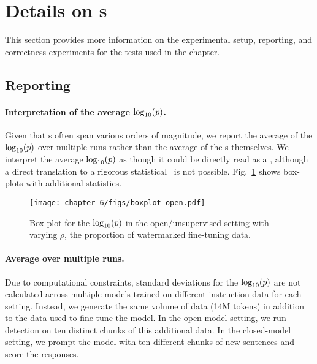 \section{Details on \pval s}\label{chap6/sec:additional}

This section provides more information on the experimental setup, reporting, and correctness experiments for the tests used in the chapter.

\subsection{Reporting}\label{chap6/app:repporting}

\paragraph{Interpretation of the average $\log_{10}(p)$.}
Given that \pval s often span various orders of magnitude, we report the average of the $\log_{10}(p)$ over multiple runs rather than the average of the \pval s themselves. 
We interpret the average $\log_{10}(p)$ as though it could be directly read as a \pval, although a direct translation to a rigorous statistical \pval\ is not possible.
Fig.~\ref{chap6/fig:box_plot_open} shows box-plots with additional statistics.

\begin{figure}[b!]
    \centering
    \texttt{[image: chapter-6/figs/boxplot\_open.pdf]}
    \captionsetup{font=small}
    \caption{Box plot for the $\log_{10}(p)$ in the open/unsupervised setting with varying $\rho$, the proportion of watermarked fine-tuning data.}
    \label{chap6/fig:box_plot_open}
\end{figure}


\paragraph{Average over multiple runs.} 
Due to computational constraints, standard deviations for the $\log_{10}(p)$ are not calculated across multiple models trained on different instruction data for each setting. 
Instead, we generate the same volume of data (14M tokens) in addition to the data used to fine-tune the model. 
In the open-model setting, we run detection on ten distinct chunks of this additional data. 
In the closed-model setting, we prompt the model with ten different chunks of new sentences and score the responses.


